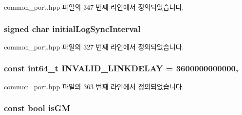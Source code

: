common\+\_\+port.\+hpp 파일의 347 번째 라인에서 정의되었습니다.

\subsubsection[{\texorpdfstring{initial\+Log\+Sync\+Interval}{initialLogSyncInterval}}]{\setlength{\rightskip}{0pt plus 5cm}signed char initial\+Log\+Sync\+Interval\hspace{0.3cm}{\ttfamily [private]}}\hypertarget{class_common_port_af64dc42272c346cc5f6f400c0e7d7088}{}\label{class_common_port_af64dc42272c346cc5f6f400c0e7d7088}


common\+\_\+port.\+hpp 파일의 327 번째 라인에서 정의되었습니다.

\subsubsection[{\texorpdfstring{I\+N\+V\+A\+L\+I\+D\+\_\+\+L\+I\+N\+K\+D\+E\+L\+AY}{INVALID_LINKDELAY}}]{\setlength{\rightskip}{0pt plus 5cm}const {\bf int64\+\_\+t} I\+N\+V\+A\+L\+I\+D\+\_\+\+L\+I\+N\+K\+D\+E\+L\+AY = 3600000000000\hspace{0.3cm}{\ttfamily [static]}, {\ttfamily [protected]}}\hypertarget{class_common_port_a12f51c79445b27ce04e3693f4d5093d7}{}\label{class_common_port_a12f51c79445b27ce04e3693f4d5093d7}


common\+\_\+port.\+hpp 파일의 363 번째 라인에서 정의되었습니다.

\subsubsection[{\texorpdfstring{is\+GM}{isGM}}]{\setlength{\rightskip}{0pt plus 5cm}const {\bf bool} is\+GM\hspace{0.3cm}{\ttfamily [protected]}}\hypertarget{class_common_port_a3e52b9e84817ee3877eb51e6e0cba296}{}\label{class_common_port_a3e52b9e84817ee3877eb51e6e0cba296}



